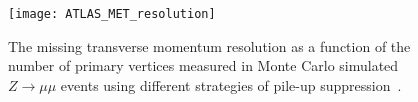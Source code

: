 \begin{figure}[ht]
  \centering
  \texttt{[image: ATLAS\_MET\_resolution]}
  \caption[ATLAS missing transverse momentum resolution.]{The missing transverse
    momentum resolution as a function of the number of primary vertices measured
    in Monte Carlo simulated $Z \to \mu\mu$ events using different strategies of
    pile-up suppression~\cite{RUNII_MET_PERF}.
  }
  \label{fig:met-res}
\end{figure}
